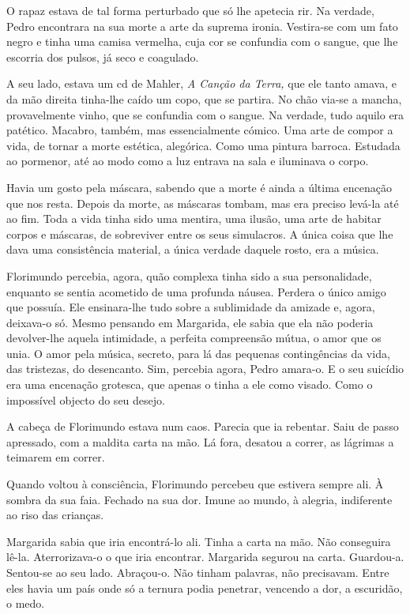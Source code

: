 O rapaz estava de tal forma perturbado que só lhe apetecia rir. Na
verdade, Pedro encontrara na sua morte a arte da suprema ironia.
Vestira-se com um fato negro e tinha uma camisa vermelha, cuja cor se
confundia com o sangue, que lhe escorria dos pulsos, já seco e
coagulado.

A seu lado, estava um cd de Mahler, \emph{A Canção da Terra, }que ele
tanto amava, e da mão direita tinha-lhe caído um copo, que se partira.
No chão via-se a mancha, provavelmente vinho, que se confundia com o
sangue. Na verdade, tudo aquilo era patético. Macabro, também, mas
essencialmente cómico. Uma arte de compor a vida, de tornar a morte
estética, alegórica. Como uma pintura barroca. Estudada ao pormenor, até
ao modo como a luz entrava na sala e iluminava o corpo.

Havia um gosto pela máscara, sabendo que a morte é ainda a última
encenação que nos resta. Depois da morte, as máscaras tombam, mas era
preciso levá-la até ao fim. Toda a vida tinha sido uma mentira, uma
ilusão, uma arte de habitar corpos e máscaras, de sobreviver entre os
seus simulacros. A única coisa que lhe dava uma consistência material, a
única verdade daquele rosto, era a música.

Florimundo percebia, agora, quão complexa tinha sido a sua
personalidade, enquanto se sentia acometido de uma profunda náusea.
Perdera o único amigo que possuía. Ele ensinara-lhe tudo sobre a
sublimidade da amizade e, agora, deixava-o só. Mesmo pensando em
Margarida, ele sabia que ela não poderia devolver-lhe aquela intimidade,
a perfeita compreensão mútua, o amor que os unia. O amor pela música,
secreto, para lá das pequenas contingências da vida, das tristezas, do
desencanto. Sim, percebia agora, Pedro amara-o. E o seu suicídio era uma
encenação grotesca, que apenas o tinha a ele como visado. Como o
impossível objecto do seu desejo.

A cabeça de Florimundo estava num caos. Parecia que ia rebentar. Saiu de
passo apressado, com a maldita carta na mão. Lá fora, desatou a correr,
as lágrimas a teimarem em correr.

Quando voltou à consciência, Florimundo percebeu que estivera sempre
ali. À sombra da sua faia. Fechado na sua dor. Imune ao mundo, à
alegria, indiferente ao riso das crianças.

Margarida sabia que iria encontrá-lo ali. Tinha a carta na mão. Não
conseguira lê-la. Aterrorizava-o o que iria encontrar. Margarida segurou
na carta. Guardou-a. Sentou-se ao seu lado. Abraçou-o. Não tinham
palavras, não precisavam. Entre eles havia um país onde só a ternura
podia penetrar, vencendo a dor, a escuridão, o medo.

